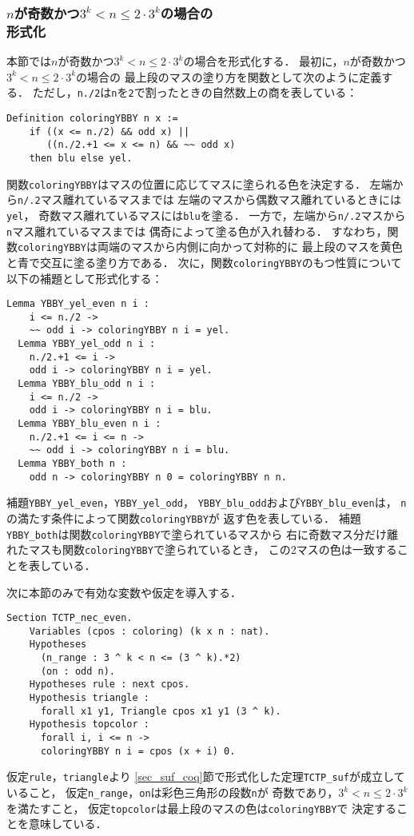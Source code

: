 \subsubsection{$n$が奇数かつ$3^{k} < n \leq 2 \cdot 3^{k}$の場合の\\形式化}
本節では$n$が奇数かつ$3^{k} < n \leq 2 \cdot 3^{k}$の場合を形式化する．
最初に，$n$が奇数かつ$3^{k} < n \leq 2 \cdot 3^{k}$の場合の
最上段のマスの塗り方を関数として次のように定義する．
ただし，{\tt{n./2}}は{\tt{n}}を{\tt{2}}で割ったときの自然数上の商を表している：
\begin{lstlisting}[language=Coq]
  Definition coloringYBBY n x :=
    if ((x <= n./2) && odd x) ||
       ((n./2.+1 <= x <= n) && ~~ odd x)
    then blu else yel.
\end{lstlisting}
関数{\tt{coloringYBBY}}はマスの位置に応じてマスに塗られる色を決定する．
左端から{\tt{n/.2}}マス離れているマスまでは
左端のマスから偶数マス離れているときには{\tt{yel}}，
奇数マス離れているマスには{\tt{blu}}を塗る．
一方で，左端から{\tt{n/.2}}マスから{\tt{n}}マス離れているマスまでは
偶奇によって塗る色が入れ替わる．
すなわち，関数{\tt{coloringYBBY}}は両端のマスから内側に向かって対称的に
最上段のマスを黄色と青で交互に塗る塗り方である．
次に，関数{\tt{coloringYBBY}}のもつ性質について以下の補題として形式化する：
\begin{lstlisting}[language=Coq]
  Lemma YBBY_yel_even n i :
    i <= n./2 ->
    ~~ odd i -> coloringYBBY n i = yel.
  Lemma YBBY_yel_odd n i :
    n./2.+1 <= i ->
    odd i -> coloringYBBY n i = yel.
  Lemma YBBY_blu_odd n i :
    i <= n./2 ->
    odd i -> coloringYBBY n i = blu.
  Lemma YBBY_blu_even n i :
    n./2.+1 <= i <= n ->
    ~~ odd i -> coloringYBBY n i = blu.
  Lemma YBBY_both n :
    odd n -> coloringYBBY n 0 = coloringYBBY n n.
\end{lstlisting}
補題{\tt{YBBY\_yel\_even}}，{\tt{YBBY\_yel\_odd}}，
{\tt{YBBY\_blu\_odd}}および{\tt{YBBY\_blu\_even}}は，
{\tt{n}}の満たす条件によって関数{\tt{coloringYBBY}}が
返す色を表している．
補題{\tt{YBBY\_both}}は関数{\tt{coloringYBBY}}で塗られているマスから
右に奇数マス分だけ離れたマスも関数{\tt{coloringYBBY}}で塗られているとき，
この2マスの色は一致することを表している．

次に本節のみで有効な変数や仮定を導入する．
\begin{lstlisting}[language=Coq]
  Section TCTP_nec_even.
    Variables (cpos : coloring) (k x n : nat).
    Hypotheses
      (n_range : 3 ^ k < n <= (3 ^ k).*2)
      (on : odd n).
    Hypotheses rule : next cpos.
    Hypothesis triangle :
      forall x1 y1, Triangle cpos x1 y1 (3 ^ k).
    Hypothesis topcolor :
      forall i, i <= n ->
      coloringYBBY n i = cpos (x + i) 0.
\end{lstlisting}
仮定{\tt{rule}}，{\tt{triangle}}より
\ref{sec_suf_coq}節で形式化した定理{\tt{TCTP\_suf}}が成立していること，
仮定{\tt{n\_range}}，{\tt{on}}は彩色三角形の段数{\tt{n}}が
奇数であり，$3^{k} < n \leq 2 \cdot 3^{k}$を満たすこと，
仮定{\tt{topcolor}}は最上段のマスの色は{\tt{coloringYBBY}}で
決定することを意味している．


